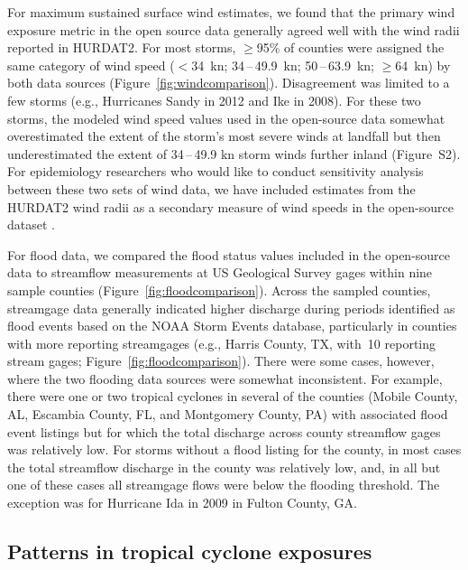 For maximum sustained surface wind estimates, we found that the primary wind
exposure metric in the open source data generally agreed well with the wind
radii reported in \ac{HURDAT2}. For most storms, $\ge$95\% of counties were
assigned the same category of wind speed ($<$34~\si{\knot};
34\,--\,49.9~\si{\knot}; 50\,--\,63.9~\si{\knot}; $\ge$64~\si{\knot}) by both
data sources (Figure~\ref{fig:windcomparison}).  Disagreement was limited to a
few storms (e.g., Hurricanes Sandy in 2012 and Ike in 2008). For these two
storms, the modeled wind speed values used in the open-source data somewhat
overestimated the extent of the storm's most severe winds at landfall but then
underestimated the extent of 34\,--\,49.9 \si{\knot} storm winds further inland
(Figure~S2). For epidemiology researchers who would like to conduct sensitivity
analysis between these two sets of wind data, we have included estimates from
the \ac{HURDAT2} wind radii as a secondary measure of wind speeds in the
open-source dataset \parencite{hurricaneexposuredata}.

For flood data, we compared the flood status values included in the open-source
data to streamflow measurements at \ac{US} Geological Survey gages within nine
sample counties (Figure~\ref{fig:floodcomparison}). Across the sampled
counties, streamgage data generally indicated higher discharge during periods
identified as flood events based on the NOAA Storm Events database,
particularly in counties with more reporting streamgages (e.g., Harris County,
TX, with~10 reporting stream gages; Figure~\ref{fig:floodcomparison}). There
were some cases, however, where the two flooding data sources were somewhat
inconsistent.  For example, there were one or two tropical cyclones in several
of the counties (Mobile County, AL, Escambia County, FL, and Montgomery County,
PA) with associated flood event listings but for which the total discharge
across county streamflow gages was relatively low. For storms without a flood
listing for the county, in most cases the total streamflow discharge in the
county was relatively low, and, in all but one of these cases all streamgage
flows were below the flooding threshold. The exception was for Hurricane Ida in
2009 in Fulton County, GA. 

\subsection*{Patterns in tropical cyclone exposures}

